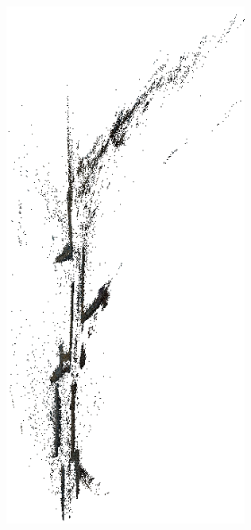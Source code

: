 \documentclass[11pt]{article}
\begin{document}
    \begin{figure}
        \centering
        \begin{subfigure}{0.45\textwidth}
            \centering
            \includegraphics[width=\linewidth]{images/experiment/ply_distorted}

\end{subfigure}
\end{figure}
\end{document}
